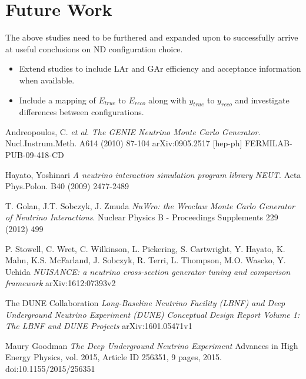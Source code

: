 \documentclass[12pt]{article}
\begin{document}
\section{Future Work}\label{sec:Future}

The above studies need to be furthered and expanded upon to successfully arrive at useful conclusions on ND configuration choice. 

\begin{itemize}


\item Extend studies to include LAr and GAr efficiency and acceptance information when available.
\item Include a mapping of $E_{true}$ to $E_{reco}$ along with $y_{true}$ to $y_{reco}$ and investigate differences between configurations.

\end{itemize}




\begin{thebibliography}{1}

Andreopoulos, C. \textit{et al}.
\textit{The GENIE Neutrino Monte Carlo Generator}.
Nucl.Instrum.Meth. A614 (2010) 87-104 arXiv:0905.2517 [hep-ph] FERMILAB-PUB-09-418-CD

Hayato, Yoshinari 
\textit{A neutrino interaction simulation program library NEUT}.
Acta Phys.Polon. B40 (2009) 2477-2489

T. Golan, J.T. Sobczyk, J. Zmuda
\textit{NuWro: the Wrocław Monte Carlo Generator of Neutrino Interactions}.
Nuclear Physics B - Proceedings Supplements 229 (2012) 499

P. Stowell, C. Wret, C. Wilkinson, L. Pickering, S. Cartwright, Y. Hayato, K. Mahn, K.S. McFarland, J. Sobczyk, R. Terri, L. Thompson, M.O. Wascko, Y. Uchida
\textit{NUISANCE: a neutrino cross-section generator tuning and comparison framework}
arXiv:1612:07393v2

The DUNE Collaboration
\textit{Long-Baseline Neutrino Facility (LBNF) and Deep Underground Neutrino Experiment (DUNE) Conceptual Design Report Volume 1: The LBNF and DUNE Projects}
arXiv:1601.05471v1

Maury Goodman
\textit{The Deep Underground Neutrino Experiment}
Advances in High Energy Physics, vol. 2015, Article ID 256351, 9 pages, 2015. doi:10.1155/2015/256351

\end{thebibliography}
\end{document}
